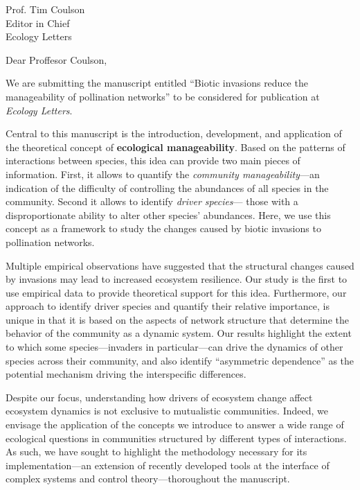 \documentclass[10pt, a4paper]{letter}
\begin{document}
\begin{letter}{
       Prof. Tim Coulson\\
       Editor in Chief\\
       Ecology Letters}

\opening{Dear Proffesor Coulson,}

We are submitting the manuscript entitled ``Biotic invasions reduce the manageability of pollination networks'' to be considered for publication at \emph{Ecology Letters}. 

Central to this manuscript is the introduction, development, and application of the theoretical concept of \textbf{ecological manageability}.
Based on the patterns of interactions between species, this idea can provide two main pieces of information. 
First, it allows to quantify the \textit{community manageability}---an indication of the difficulty of controlling the abundances of all species in the community. 
Second it allows to identify \textit{driver species}--- those with a disproportionate ability to alter other species' abundances.  
Here, we use this concept as a framework to study the changes caused by biotic invasions to pollination networks. 

Multiple empirical observations have suggested that the structural changes caused by invasions may lead to increased ecosystem resilience. 
Our study is the first to use empirical data to provide theoretical support for this idea. 
Furthermore, our approach to identify driver species and quantify their relative importance, is unique in that it is based on the aspects of network structure that determine the behavior of the community as a dynamic system. 
Our results highlight the extent to which some species---invaders in particular---can drive the dynamics of other species across their community, and also identify ``asymmetric dependence'' as the potential mechanism driving the interspecific differences.

Despite our focus, understanding how drivers of ecosystem change affect ecosystem dynamics is not exclusive to mutualistic communities. 
Indeed, we envisage the application of the concepts we introduce to answer a wide range of ecological questions in communities structured by different types of interactions.
As such, we have sought to highlight the methodology necessary for its implementation---an extension of recently developed tools at the interface of complex systems and control theory---thoroughout the manuscript. 


\end{letter}
\end{document}
